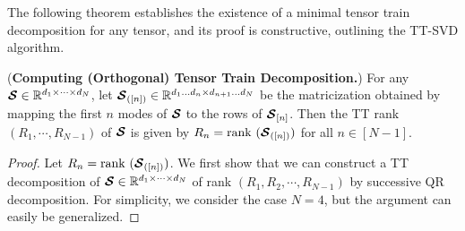 The following theorem establishes the existence of a minimal tensor train decomposition for any tensor, and its proof is constructive, outlining the TT-SVD algorithm.
\begin{theorem}(\textbf{Computing (Orthogonal) Tensor Train Decomposition.})\label{thm:tt-decomposition}
For any $\bm{\mathcal{S}}\in\mathbb{R}^{d_1\times\dots\times d_N}$, let $\bm{\mathcal{S}}_{([n])}\in\mathbb{R}^{d_1\dots d_n\times d_{n+1}\dots d_N}$ be the matricization obtained by mapping the first $n$  modes of $\bm{\mathcal{S}}$ to the rows of $\bm{\mathcal{S}}_{[n]}$. Then the TT rank $(R_1,\cdots,R_{N-1})$ of $\bm{\mathcal{S}}$  is given
by
    $R_n = \mathrm{rank}~(\bm{\mathcal{S}}_{([n])})$ for all $n\in[N-1]$.
\end{theorem}
\begin{proof}
    Let $R_n = \mathrm{rank}~(\bm{\mathcal{S}}_{([n])})$. We first show that we can construct a TT decomposition of $\bm{\mathcal{S}}\in\mathbb{R}^{d_1\times\cdots\times d_N}$ of rank $(R_1,R_2,\cdots,R_{N-1})$ by successive QR decomposition. For simplicity, we consider the case $N=4$, but the argument can easily be generalized.


\end{proof}

